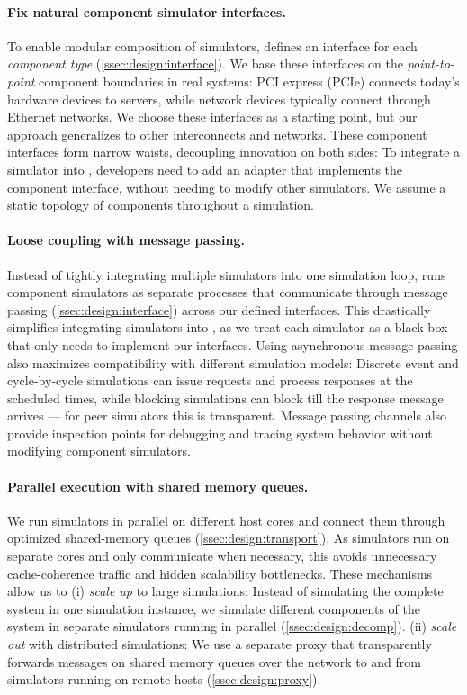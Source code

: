 \paragraph{Fix natural component simulator interfaces.}
To enable modular composition of simulators, \sysname defines an
interface for each \textit{component type}
(\autoref{ssec:design:interface}).
%
We base these interfaces on the \emph{point-to-point} component
boundaries in real systems:
PCI express (PCIe) connects today's hardware devices to servers, while
network devices typically connect through Ethernet networks.
%
We choose these interfaces as a starting point, but our approach
generalizes to other interconnects and networks.
%
These component interfaces form narrow waists, decoupling innovation on
both sides:
%
To integrate a simulator into \sysname, developers need to add an
adapter that implements the component interface, without needing to
modify other simulators.
%
We assume a static topology of components throughout a simulation.


\paragraph{Loose coupling with message passing.}
Instead of tightly integrating multiple simulators into one simulation
loop, \sysname runs component simulators as separate processes that
communicate through message passing (\autoref{ssec:design:interface})
across our defined interfaces.
%
This drastically simplifies integrating simulators into \sysname,
as we treat each simulator as a black-box that only needs to
implement our interfaces.
%
Using asynchronous message passing also maximizes compatibility with
different simulation models:
%
Discrete event and cycle-by-cycle simulations can issue requests and
process responses at the scheduled times, while blocking simulations
can block till the response message arrives --- for peer simulators
this is transparent.
%
Message passing channels also provide inspection points for debugging
and tracing system behavior without modifying component simulators.


\paragraph{Parallel execution with shared memory queues.}
We run simulators in parallel on different host cores and connect them
through optimized shared-memory queues
(\autoref{ssec:design:transport}).
%
As simulators run on separate cores and only communicate when
necessary, this avoids unnecessary cache-coherence traffic and
hidden scalability bottlenecks.
%
These mechanisms allow us to
(i) \textit{scale up} to large simulations: Instead of simulating the
complete system in one simulation instance, we simulate different
components of the system in separate simulators running in parallel
(\autoref{ssec:design:decomp}).
%
(ii) \textit{scale out} with distributed simulations: We use a
separate proxy that transparently forwards messages on shared memory
queues over the network to and from simulators running on remote hosts
(\autoref{ssec:design:proxy}).



